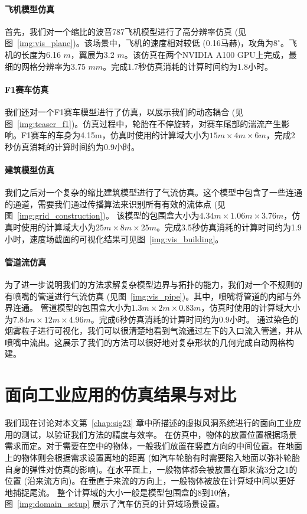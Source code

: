 \paragraph{飞机模型仿真}
首先，我们对一个缩比的波音787飞机模型进行了高分辨率仿真 (见图~\ref{img:vis_plane})。该场景中，飞机的速度相对较低 (0.16马赫)，攻角为$8^{\circ}$。飞机的长度为6.16 $m$，翼展为3.2 $m$。该仿真在两个NVIDIA A100 GPU上完成，最细的网格分辨率为3.75 $mm$。完成1.7秒仿真消耗的计算时间约为1.8小时。

\paragraph{F1赛车仿真}
我们还对一个F1赛车模型进行了仿真，以展示我们的动态耦合 (见图~\ref{img:teaser_f1})。仿真过程中，轮胎在不停旋转，对赛车尾部的湍流产生影响。F1赛车的车身为4.15m，仿真时使用的计算域大小为$15m\!\times\!4m\!\times\!6m$，完成2秒仿真消耗的计算时间约为0.9小时。

\paragraph{建筑模型仿真}
我们之后对一个复杂的缩比建筑模型进行了气流仿真。这个模型中包含了一些连通的通道，需要我们通过传播算法来识别所有有效的流体点 (见图~\ref{img:grid_construction})。
该模型的包围盒大小为$4.34m\!\times\!1.06m\!\times\!3.76m$，仿真时使用的计算域大小为$25m\!\times\!8m\!\times\!25m$。完成3.5秒仿真消耗的计算时间约为1.9小时，速度场截面的可视化结果可见图~\ref{img:vis_building}。

\paragraph{管道流仿真}
为了进一步说明我们的方法求解复杂模型边界与拓扑的能力，我们对一个不规则的有喷嘴的管道进行气流仿真 (见图~\ref{img:vis_pipe})。其中，喷嘴将管道的内部与外界连通。
管道模型的包围盒大小为$1.3m\!\times\!2m\!\times\!0.83m$，仿真时使用的计算域大小为$7.84m\!\times\!12m\!\times\!4.96m$。完成6秒仿真消耗的计算时间约为0.9小时。
通过染色的烟雾粒子进行可视化，我们可以很清楚地看到气流通过左下的入口流入管道，并从喷嘴中流出。这展示了我们的方法可以很好地对复杂形状的几何完成自动网格构建。

\section{面向工业应用的仿真结果与对比}
我们现在讨论对本文第~\ref{chap:sig23} 章中所描述的虚拟风洞系统进行的面向工业应用的测试，以验证我们方法的精度与效率。
在仿真中，物体的放置位置根据场景需求而定。对于需要在空中的物体，一般我们放置在竖直方向的中间位置。在地面上的物体则会根据需求设置离地的距离 (如汽车轮胎有时需要陷入地面以弥补轮胎自身的弹性对仿真的影响)。在水平面上，一般物体都会被放置在距来流3分之1的位置 (沿来流方向)。在垂直于来流的方向上，一般物体被放在计算域中间以更好地捕捉尾流。
整个计算域的大小一般是模型包围盒的8到10倍，图~\ref{img:domain_setup} 展示了汽车仿真的计算域场景设置。

